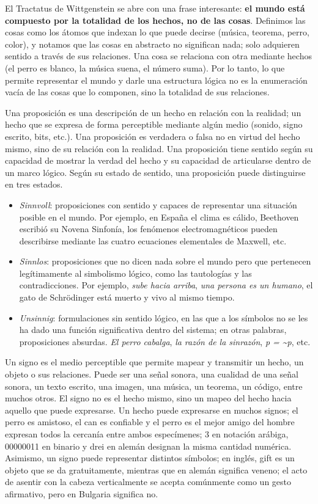 \documentclass{article}
\begin{document}
El Tractatus de Wittgenstein se abre con una frase interesante:
\textbf{el mundo está compuesto por la totalidad de los hechos, no de
las cosas}. Definimos las cosas como los átomos que indexan lo que puede
decirse (música, teorema, perro, color), y notamos que las cosas en
abstracto no significan nada; solo adquieren sentido a través de sus
relaciones. Una cosa se relaciona con otra mediante hechos (el perro es
blanco, la música suena, el número suma). Por lo tanto, lo que permite
representar el mundo y darle una estructura lógica no es la enumeración
vacía de las cosas que lo componen, sino la totalidad de sus relaciones.

Una proposición es una descripción de un hecho en relación con la
realidad; un hecho que se expresa de forma perceptible mediante algún
medio (sonido, signo escrito, bits, etc.). Una proposición es verdadera
o falsa no en virtud del hecho mismo, sino de su relación con la
realidad. Una proposición tiene sentido según su capacidad de mostrar la
verdad del hecho y su capacidad de articularse dentro de un marco
lógico. Según su estado de sentido, una proposición puede distinguirse
en tres estados.

\begin{itemize}
\item
  \emph{Sinnvoll}: proposiciones con sentido y capaces de representar
  una situación posible en el mundo. Por ejemplo, en España el clima es
  cálido, Beethoven escribió su Novena Sinfonía, los fenómenos
  electromagnéticos pueden describirse mediante las cuatro ecuaciones
  elementales de Maxwell, etc.
\item
  \emph{Sinnlos}: proposiciones que no dicen nada sobre el mundo pero
  que pertenecen legítimamente al simbolismo lógico, como las
  tautologías y las contradicciones. Por ejemplo, \emph{sube hacia
  arriba}, \emph{una persona es un humano}, el gato de Schrödinger está
  muerto y vivo al mismo tiempo.
\item
  \emph{Unsinnig}: formulaciones sin sentido lógico, en las que a los
  símbolos no se les ha dado una función significativa dentro del
  sistema; en otras palabras, proposiciones absurdas. \emph{El perro
  cabalga}, \emph{la razón de la sinrazón}, \emph{p =
  \textasciitilde p}, etc.
\end{itemize}

Un signo es el medio perceptible que permite mapear y transmitir un
hecho, un objeto o sus relaciones. Puede ser una señal sonora, una
cualidad de una señal sonora, un texto escrito, una imagen, una música,
un teorema, un código, entre muchos otros. El signo no es el hecho
mismo, sino un mapeo del hecho hacia aquello que puede expresarse. Un
hecho puede expresarse en muchos signos; el perro es amistoso, el can es
confiable y el perro es el mejor amigo del hombre expresan todos la
cercanía entre ambos especímenes; 3 en notación arábiga, 00000011 en
binario y drei en alemán designan la misma cantidad numérica. Asimismo,
un signo puede representar distintos símbolos; en inglés, gift es un
objeto que se da gratuitamente, mientras que en alemán significa veneno;
el acto de asentir con la cabeza verticalmente se acepta comúnmente como
un gesto afirmativo, pero en Bulgaria significa no.
\end{document}
